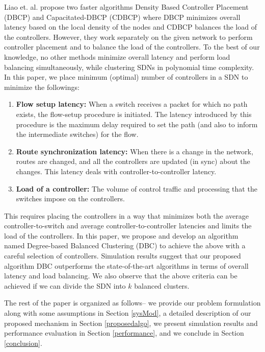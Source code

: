 \documentclass{IEEEtran}
\begin{document}
	Liao et. al. \cite{dbcp2017} propose two faster algorithms Density Based Controller Placement (DBCP) and Capacitated-DBCP (CDBCP) where DBCP minimizes overall latency based on the local density of the nodes and CDBCP balances the load of the controllers. However, they work separately on the given network to perform controller placement and to balance the load of the controllers. To the best of our knowledge, no other methods minimize overall latency and perform load balancing simultaneously, while clustering SDNs in polynomial time complexity. In this paper, we place minimum (optimal) number of controllers in a SDN to minimize the followings:
	\begin{enumerate}
		\item \textbf{Flow setup latency:} When a switch receives a packet for which no path exists, the flow-setup procedure is initiated. The latency introduced by this procedure is the maximum delay required to set the path (and also to inform the intermediate switches) for the flow.
		\item \textbf{Route synchronization latency:} When there is a change in the network, routes are changed, and all the controllers are updated (in sync) about the changes. This latency deals with controller-to-controller latency.
		\item \textbf{Load of a controller:} The volume of control traffic and processing that the switches impose on the controllers.
	\end{enumerate}
	
	This requires placing the controllers in a way that minimizes both the average controller-to-switch and average controller-to-controller latencies and limits the load of the controllers. In this paper, we propose and develop an algorithm named Degree-based Balanced Clustering (DBC) to achieve the above with a careful selection of controllers. Simulation results suggest that our proposed algorithm DBC outperforms the state-of-the-art algorithms in terms of overall latency and load balancing. We also observe that the above criteria can be achieved if we can divide the SDN into $k$ balanced clusters.
	
	The rest of the paper is organized as follows-- we provide our problem formulation along with some assumptions in Section \ref{sysMod}, a detailed description of our proposed mechanism in Section \ref{proposedalgo}, we present simulation results and performance evaluation in Section \ref{performance}, and we conclude in Section \ref{conclusion}.
	
\end{document}
